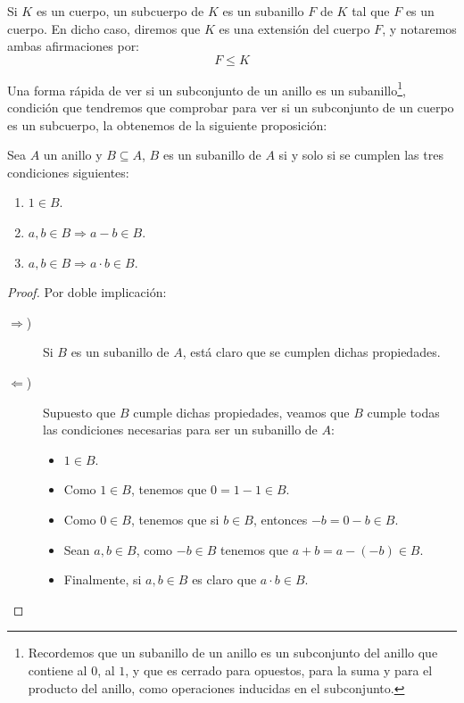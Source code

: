\begin{definicion}
    Si $K$ es un cuerpo, un subcuerpo de $K$ es un subanillo $F$ de $K$ tal que $F$ es un cuerpo. En dicho caso, diremos que $K$ es una extensión del cuerpo $F$, y notaremos ambas afirmaciones por:
    \begin{equation*}
        F\leq K
    \end{equation*}
\end{definicion}

\noindent
Una forma rápida de ver si un subconjunto de un anillo es un subanillo\footnote{Recordemos que un subanillo de un anillo es un subconjunto del anillo que contiene al $0$, al $1$, y que es cerrado para opuestos, para la suma y para el producto del anillo, como operaciones inducidas en el subconjunto.}, condición que tendremos que comprobar para ver si un subconjunto de un cuerpo es un subcuerpo, la obtenemos de la siguiente proposición:

\begin{prop}
    Sea $A$ un anillo y $B\subseteq A$, $B$ es un subanillo de $A$ si y solo si se cumplen las tres condiciones siguientes:
    \begin{enumerate}
        \item $1\in B$.
        \item $a,b\in B \Longrightarrow a-b\in B$.
        \item $a,b\in B \Longrightarrow a\cdot b\in B$.
    \end{enumerate}
    \begin{proof}
        Por doble implicación:
        \begin{description}
            \item [$\Longrightarrow$)] Si $B$ es un subanillo de $A$, está claro que se cumplen dichas propiedades.
            \item [$\Longleftarrow$)] Supuesto que $B$ cumple dichas propiedades, veamos que $B$ cumple todas las condiciones necesarias para ser un subanillo de $A$:
                \begin{itemize}
                    \item $1\in B$.
                    \item Como $1\in B$, tenemos que $0 = 1 -1 \in B$.
                    \item Como $0\in B$, tenemos que si $b\in B$, entonces $-b = 0-b\in B$.
                    \item Sean $a,b\in B$, como $-b\in B$ tenemos que $a+b = a-(-b)\in B$.
                    \item Finalmente, si $a,b\in B$ es claro que $a\cdot b\in B$.
                \end{itemize}
        \end{description}
    \end{proof}
\end{prop}


